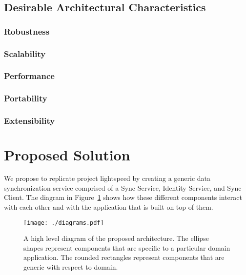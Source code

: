 \documentclass[12pt]{article}
\begin{document}
        \subsection{Desirable Architectural Characteristics}
            \subsubsection{Robustness}
            \subsubsection{Scalability}
            \subsubsection{Performance}
            \subsubsection{Portability}
            \subsubsection{Extensibility}

    \section{Proposed Solution}
    We propose to replicate project lightspeed by creating a generic data synchronization service comprised of a Sync Service, Identity Service, and Sync Client.
    The diagram in Figure~\ref{fig:high-level} shows how these different components interact with each other and with the application that is built on top of them.

    \begin{figure}
        \centering
        \texttt{[image: ./diagrams.pdf]}
        \caption{A high level diagram of the proposed architecture. The ellipse shapes represent components that are specific to a particular domain application. The rounded rectangles represent components that are generic with respect to domain. \label{fig:high-level}}
    \end{figure}
\end{document}
